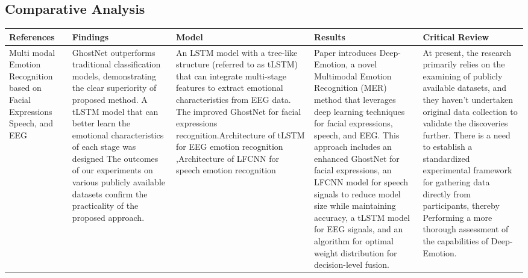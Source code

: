 \documentclass[conference]{IEEEtran}
\begin{document}
\newpage
\begin{center}
\section{Comparative Analysis}
\end{center}
\begin{longtable}
[h]
\begin{tabularx}{\textwidth}{|>{\raggedright\arraybackslash}X|>{\raggedright\arraybackslash}X|>{\raggedright\arraybackslash}X|>{\raggedright\arraybackslash}X|>{\raggedright\arraybackslash}X|}
\hline
References  & Findings  & Model  & Results & Critical Review \\

\hline
Multi modal Emotion Recognition based on Facial Expressions Speech, and EEG& 
GhostNet outperforms traditional classification models, demonstrating the clear superiority of proposed method. A tLSTM model that can better learn the emotional characteristics of each stage was designed The outcomes of our experiments on various publicly available datasets confirm the practicality of the proposed approach.& An LSTM model with a tree-like structure (referred to as tLSTM) that can integrate multi-stage features to extract emotional characteristics from EEG data. The improved GhostNet for facial expressions recognition.Architecture of tLSTM for EEG emotion recognition ,Architecture of LFCNN for speech emotion recognition & Paper introduces Deep-Emotion, a novel Multimodal Emotion Recognition (MER) method that leverages deep learning techniques for facial expressions, speech, and EEG. This approach includes an enhanced GhostNet for facial expressions, an LFCNN model for speech signals to reduce model size while maintaining accuracy, a tLSTM model for EEG signals, and an algorithm for optimal weight distribution for decision-level fusion.& At present, the research primarily relies on the examining  of publicly available datasets, and they haven't undertaken original data collection to validate the discoveries further.  There is a need to establish a standardized experimental framework for gathering data directly from participants, thereby Performing a more thorough assessment of the capabilities of Deep-Emotion.\\


\end{tabularx}
\end{longtable}
\end{document}
